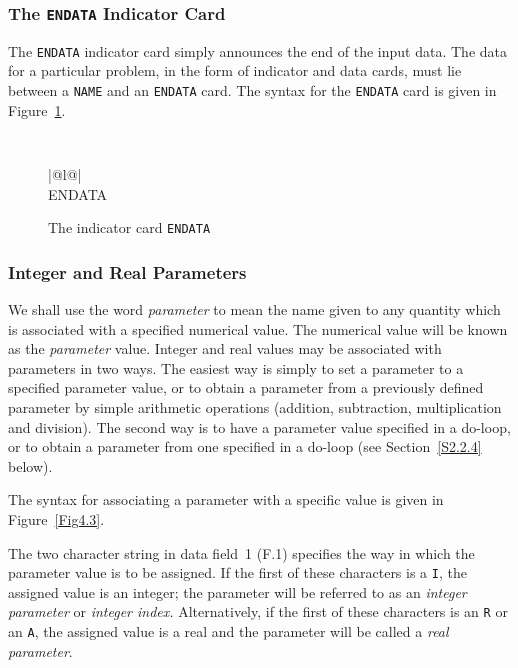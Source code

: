 \documentclass[a4paper]{article}
\newcommand{\bcftable}[1]{\begin{figure}[htbp]
                          \begin{center}
                          \begin{tabular}{#1} }
\newcommand{\ecftable}[1]{\end{tabular}
                          \caption{#1}
                          \end{center}
                          \end{figure} }
\begin{document}
\subsubsection{\label{S2.2.2}The {\tt ENDATA} Indicator Card}

The {\tt ENDATA}
indicator card simply announces the end of the input data.
The data for a particular problem, in the form of indicator and
data cards, must lie between a {\tt NAME} and an {\tt ENDATA} card.
The syntax for the {\tt ENDATA} card
is given in Figure~\ref{F2.2.2}.

{\tt
\bcftable{|@{}l@{}|}
\\
\hline
ENDATA \\
\hline
\ecftable{\label{F2.2.2}The indicator card {\tt ENDATA}}
}

\subsubsection{\label{S2.2.3}Integer and Real Parameters}

We shall use the  word {\em parameter}  to mean the name given  to any
quantity  which is associated with a  specified   numerical value. The
numerical value will be known  as the {\em  parameter} value.  Integer
and  real values may  be associated  with parameters  in two ways. The
easiest  way  is simply to set  a  parameter to a  specified parameter
value, or to obtain a parameter from a previously defined parameter by
simple  arithmetic   operations (addition, subtraction, multiplication
and division).  The second way is  to have a parameter value specified
in a do-loop,
or to obtain a parameter from one specified in a do-loop
(see Section~\ref{S2.2.4} below).

The syntax for associating a parameter
with a specific value is given in Figure~\ref{Fig4.3}.

The two character  string in data  field~1 (F.1) specifies  the way in
which  the parameter value is  to be assigned.  If  the first of these
characters   is a {\tt   I}, the  assigned  value  is  an integer; the
parameter will be referred  to as an  {\em integer parameter}  or {\em
integer index.} Alternatively, if the first of  these characters is an
{\tt R} or an {\tt A}, the assigned value  is a real and the parameter
will be called a {\em real parameter}.
\end{document}
